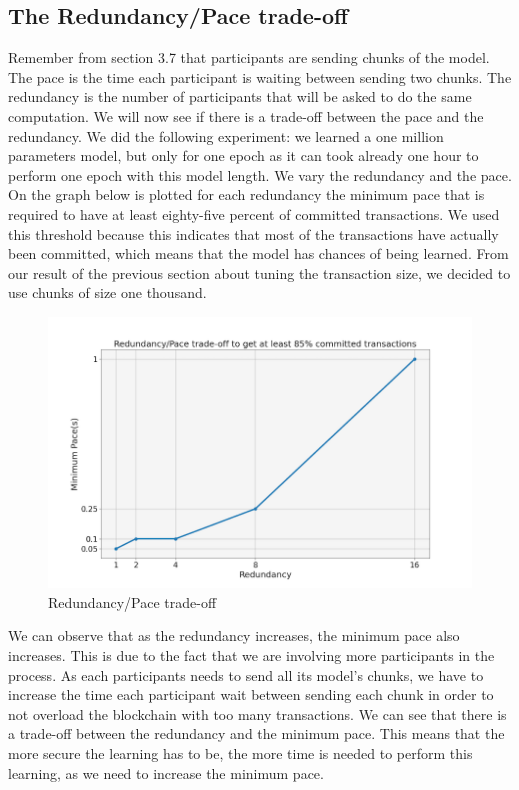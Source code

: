\documentclass{article}
\begin{document}
\subsection{The Redundancy/Pace trade-off}
Remember from section 3.7 that participants are sending chunks of the model. The pace is the time each participant is
waiting between sending two chunks. The redundancy is the number of participants that will be asked to do the same
computation. We will now see if there is a trade-off between the pace and the redundancy. We did the following experiment:
we learned a one million parameters model, but only for one epoch as it can took already one hour to perform one epoch with
this model length. We vary the redundancy and the pace. On the graph below is plotted for each
redundancy the minimum pace that is required to have at least eighty-five percent of committed transactions. We used this threshold
because this indicates that most of the transactions have actually been committed, which
means that the model has chances of being learned. From our result of the previous section about tuning the
transaction size, we decided to use chunks of size one thousand.
\begin{figure}[H]
    \hspace*{-2cm}
        \includegraphics[scale=0.7]{redundancy_pace}
    \hspace{2mm}%
    \caption{Redundancy/Pace trade-off}
\end{figure}
We can observe that as the redundancy increases, the minimum pace also increases. This is due to the fact that we are
involving more participants in the process. As each participants needs to send all its model's chunks, we have to
increase the time each participant wait between sending each chunk in order to not overload the blockchain with
too many transactions. We can see that there is a trade-off between the redundancy and the minimum pace. This means
that the more secure the learning has to be, the more time is needed to perform this learning, as we need to increase
the minimum pace.
\end{document}
